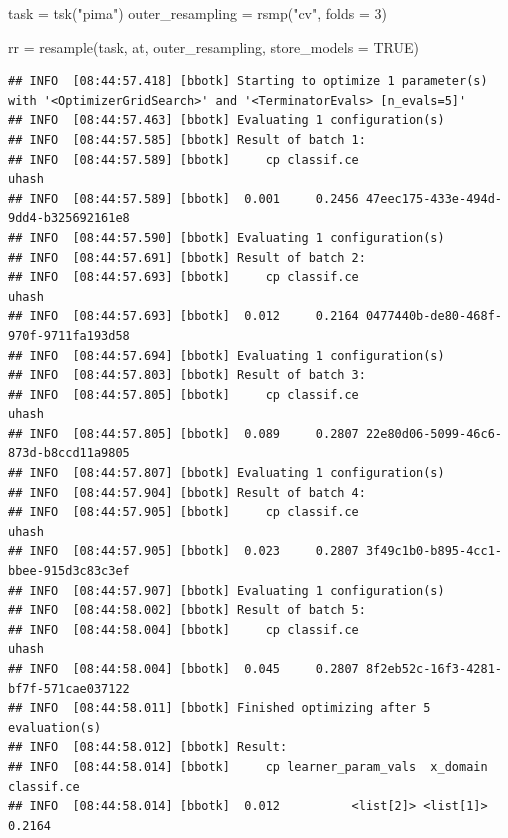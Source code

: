 \documentclass[
]{scrbook}
\newenvironment{Shaded}{\begin{snugshade}}{\end{snugshade}}
\newcommand{\AttributeTok}[1]{\textcolor[rgb]{0.77,0.63,0.00}{#1}}
\newcommand{\ConstantTok}[1]{\textcolor[rgb]{0.00,0.00,0.00}{#1}}
\newcommand{\DecValTok}[1]{\textcolor[rgb]{0.00,0.00,0.81}{#1}}
\newcommand{\FunctionTok}[1]{\textcolor[rgb]{0.00,0.00,0.00}{#1}}
\newcommand{\NormalTok}[1]{#1}
\newcommand{\OtherTok}[1]{\textcolor[rgb]{0.56,0.35,0.01}{#1}}
\newcommand{\StringTok}[1]{\textcolor[rgb]{0.31,0.60,0.02}{#1}}
\renewenvironment{Shaded} {\begin{snugshade}\small} {\end{snugshade}}
\begin{document}
\begin{Shaded}
\begin{Highlighting}[]
\NormalTok{task }\OtherTok{=} \FunctionTok{tsk}\NormalTok{(}\StringTok{"pima"}\NormalTok{)}
\NormalTok{outer\_resampling }\OtherTok{=} \FunctionTok{rsmp}\NormalTok{(}\StringTok{"cv"}\NormalTok{, }\AttributeTok{folds =} \DecValTok{3}\NormalTok{)}

\NormalTok{rr }\OtherTok{=} \FunctionTok{resample}\NormalTok{(task, at, outer\_resampling, }\AttributeTok{store\_models =} \ConstantTok{TRUE}\NormalTok{)}
\end{Highlighting}
\end{Shaded}

\begin{verbatim}
## INFO  [08:44:57.418] [bbotk] Starting to optimize 1 parameter(s) with '<OptimizerGridSearch>' and '<TerminatorEvals> [n_evals=5]' 
## INFO  [08:44:57.463] [bbotk] Evaluating 1 configuration(s) 
## INFO  [08:44:57.585] [bbotk] Result of batch 1: 
## INFO  [08:44:57.589] [bbotk]     cp classif.ce                                uhash 
## INFO  [08:44:57.589] [bbotk]  0.001     0.2456 47eec175-433e-494d-9dd4-b325692161e8 
## INFO  [08:44:57.590] [bbotk] Evaluating 1 configuration(s) 
## INFO  [08:44:57.691] [bbotk] Result of batch 2: 
## INFO  [08:44:57.693] [bbotk]     cp classif.ce                                uhash 
## INFO  [08:44:57.693] [bbotk]  0.012     0.2164 0477440b-de80-468f-970f-9711fa193d58 
## INFO  [08:44:57.694] [bbotk] Evaluating 1 configuration(s) 
## INFO  [08:44:57.803] [bbotk] Result of batch 3: 
## INFO  [08:44:57.805] [bbotk]     cp classif.ce                                uhash 
## INFO  [08:44:57.805] [bbotk]  0.089     0.2807 22e80d06-5099-46c6-873d-b8ccd11a9805 
## INFO  [08:44:57.807] [bbotk] Evaluating 1 configuration(s) 
## INFO  [08:44:57.904] [bbotk] Result of batch 4: 
## INFO  [08:44:57.905] [bbotk]     cp classif.ce                                uhash 
## INFO  [08:44:57.905] [bbotk]  0.023     0.2807 3f49c1b0-b895-4cc1-bbee-915d3c83c3ef 
## INFO  [08:44:57.907] [bbotk] Evaluating 1 configuration(s) 
## INFO  [08:44:58.002] [bbotk] Result of batch 5: 
## INFO  [08:44:58.004] [bbotk]     cp classif.ce                                uhash 
## INFO  [08:44:58.004] [bbotk]  0.045     0.2807 8f2eb52c-16f3-4281-bf7f-571cae037122 
## INFO  [08:44:58.011] [bbotk] Finished optimizing after 5 evaluation(s) 
## INFO  [08:44:58.012] [bbotk] Result: 
## INFO  [08:44:58.014] [bbotk]     cp learner_param_vals  x_domain classif.ce 
## INFO  [08:44:58.014] [bbotk]  0.012          <list[2]> <list[1]>     0.2164 

\end{verbatim}
\end{document}
